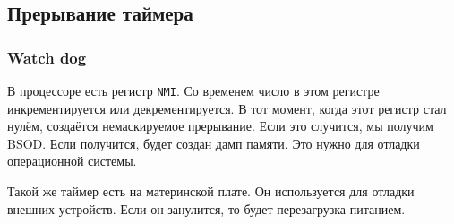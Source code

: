 \subsection{Прерывание таймера}

\subsubsection{Watch dog}

В процессоре есть регистр \verb!NMI!. Со временем число в этом регистре инкрементируется или декрементируется. В тот момент, когда этот регистр стал нулём, создаётся немаскируемое прерывание. Если это случится, мы получим BSOD. Если получится, будет создан дамп памяти. Это нужно для отладки операционной системы. 

Такой же таймер есть на материнской плате. Он используется для отладки внешних устройств. Если он занулится, то будет перезагрузка питанием. 









